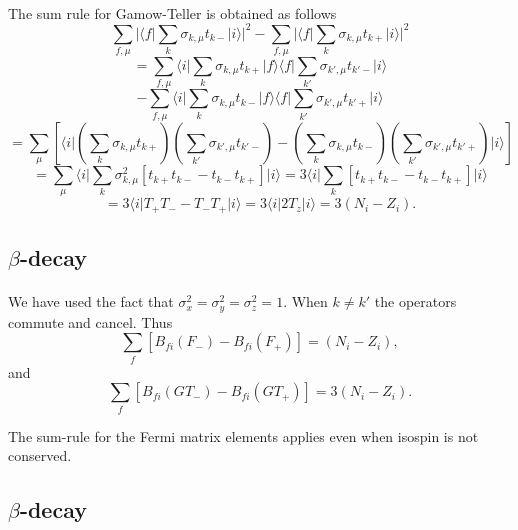\documentclass[%
twoside,                 %
final,                   %
10pt]{article}
\begin{document}
\paragraph{}
The sum rule for Gamow-Teller is obtained as follows
\[
\sum_{f,\mu}  \vert \langle f\vert  \sum_{k} \sigma_{k,\mu} t_{k-} \vert i\rangle\vert^{2}
- \sum_{f,\mu} \vert \langle f\vert  \sum_{k} \sigma_{k,\mu } t_{k+} \vert i\rangle\vert^{2}
\]
\[
= \sum_{f,\mu}\langle i\vert  \sum_{k} \sigma_{k,\mu} t_{k+} \vert f\rangle\langle f\vert  \sum_{k'} 
\sigma_{k',\mu} t_{k'-} \vert i\rangle
\]
\[
-  \sum_{f,\mu}
\langle i\vert  \sum_{k} \sigma_{k,\mu } t_{k-} \vert f\rangle\langle f\vert\sum_{k'} 
\sigma_{k',\mu } t_{k'+} \vert i\rangle
\]
\[
= \sum_{\mu} \left[\langle i\vert  \left(\sum _{k} \sigma_{k,\mu} t_{k+} \right)
    \left( \sum_{k'} \sigma_{k',\mu} t_{k'-}\right)
-   \left( \sum_{k} \sigma_{k,\mu} t_{k-} \right)
\left( \sum_{k'} \sigma_{k',\mu} t_{k'+} \right) \vert i\rangle
\right]
\]
\[
= \sum_{\mu }
\langle i\vert  \sum_{k}  \sigma ^{2}_{k,\mu } \left[ t_{k+} t_{k-} - t_{k-} t_{k+} \right] 
\vert i\rangle
= 3
\langle i\vert  \sum_{k} \left[ t_{k+} t_{k-} - t_{k-} t_{k+} \right] \vert i\rangle
\]
\[
=   3\langle i\vert  T_{+} T_{-} -  T_{-} T_{+}\vert i\rangle= 3\langle i\vert  2T_{z}\vert i\rangle  = 3(N_{i}-Z_{i}). 
\]



\subsection*{$\beta$-decay}

\paragraph{}
We have used the fact that $\sigma ^{2}_{x} = \sigma ^{2}_{y}=\sigma ^{2}_{z}=1$.
When $k \neq k'$ the operators commute and cancel.
Thus
\[
\sum_{f} \left[B_{fi}(F_{-}) - B_{fi}(F_{+}) \right] = (N_{i}-Z_{i}),       
\]
and
\[
\sum_{f} \left[ B_{fi}(GT_{-}) - B_{fi}(GT_{+}) \right] = 3(N_{i}-Z_{i}).       
\]

The sum-rule for the Fermi matrix elements applies even
when isospin is not conserved.



\subsection*{$\beta$-decay}
\end{document}
